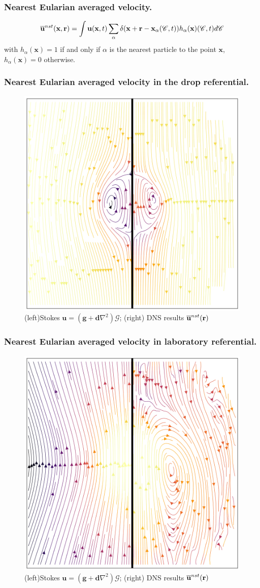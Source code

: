 \documentclass{sintefbeamer}
\begin{document}
\begin{frame}
  \frametitle{Nearest Eularian averaged velocity. }

\begin{equation*}
  \overline{\textbf{u}}^{nst}(\textbf{x},\textbf{r})
  = \int 
  \textbf{u}(\textbf{x},t)
  \sum_{\alpha}
  \delta(\textbf{x}+\textbf{r}-\textbf{x}_\alpha(\mathscr{C},t))
  h_\alpha(\textbf{x})(\mathscr{C},t)
  d\mathscr{C}
\end{equation*}
with $h_\alpha(\textbf{x}) = 1$ if and only if $\alpha$ is the nearest particle to the point $\textbf{x}$, $h_\alpha(\textbf{x}) = 0$ otherwise. 
  

\end{frame}


\begin{frame}
  \frametitle{Nearest Eularian averaged velocity in the drop referential. }
  \centering
  
  \begin{figure}
    \includegraphics[height=0.4\textwidth]{image/Stream.png}
    \caption{(left)Stokes $\textbf{u} = (\textbf{g}+\textbf{d}\nabla^2) \mathcal{G}$; (right) DNS results $\overline{\textbf{u}}^{nst}(\textbf{r})$ }
  \end{figure}
  \end{frame}
\begin{frame}
  \frametitle{Nearest Eularian averaged velocity in laboratory referential. }
  \centering
  
  \begin{figure}
    \includegraphics[height=0.4\textwidth]{image/Stream2.png}
    \caption{(left)Stokes $\textbf{u} = (\textbf{g}+\textbf{d}\nabla^2) \mathcal{G}$; (right) DNS results $\overline{\textbf{u}}^{nst}(\textbf{r})$ }
  \end{figure}
  \end{frame}
\end{document}
